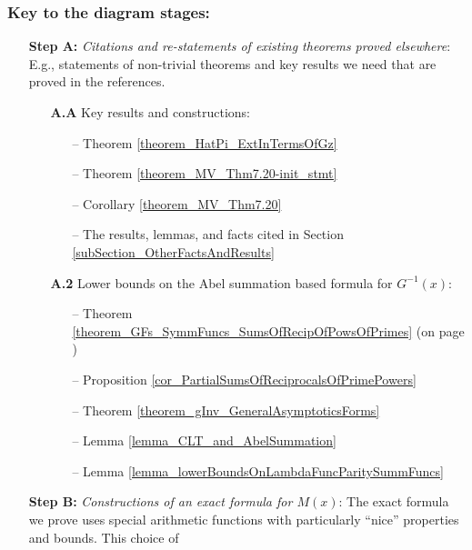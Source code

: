\documentclass[11pt,reqno,a4letter]{article}
\numberwithin{figure}{section}
\numberwithin{table}{section}
\theoremstyle{plain}
\numberwithin{theorem}{section}
\theoremstyle{definition}
\begin{document}
\subsubsection*{Key to the diagram stages: } 
\begin{itemize}[noitemsep,topsep=0pt]

\item[\textbf{Step A:}] \textit{Citations and re-statements of existing theorems proved elsewhere}: 
     E.g., statements of non-trivial theorems and key results we need that are proved in the references. 
     \begin{itemize}[noitemsep,topsep=0pt] 
     \item[\textbf{A.A}] Key results and constructions: 
          \begin{itemize}[noitemsep,topsep=0pt]
          \item[--] \small{Theorem \ref{theorem_HatPi_ExtInTermsOfGz}} 
          \item[--] \small{Theorem \ref{theorem_MV_Thm7.20-init_stmt}} 
          \item[--] \small{Corollary \ref{theorem_MV_Thm7.20}} 
          \item[--] \small{The results, lemmas, and facts cited in Section \ref{subSection_OtherFactsAndResults}}
          \end{itemize} 
     \item[\textbf{A.2}] Lower bounds on the Abel summation based formula for $G^{-1}(x)$: 
          \begin{itemize}[noitemsep,topsep=0pt]
          \item[--] \small{Theorem \ref{theorem_GFs_SymmFuncs_SumsOfRecipOfPowsOfPrimes} 
                    (on page \pageref{proofOf_theorem_GFs_SymmFuncs_SumsOfRecipOfPowsOfPrimes})} 
          \item[--] \small{Proposition \ref{cor_PartialSumsOfReciprocalsOfPrimePowers}} 
          \item[--] \small{Theorem \ref{theorem_gInv_GeneralAsymptoticsForms}} 
          \item[--] \small{Lemma \ref{lemma_CLT_and_AbelSummation}} 
          \item[--] \small{Lemma \ref{lemma_lowerBoundsOnLambdaFuncParitySummFuncs}} 
          \end{itemize} 
     \end{itemize} 
\item[\textbf{Step B:}] \textit{Constructions of an exact formula for $M(x)$}: The exact formula we prove 
     uses special arithmetic functions with particularly ``nice'' properties and bounds. This choice of 

\end{itemize}
\end{document}
